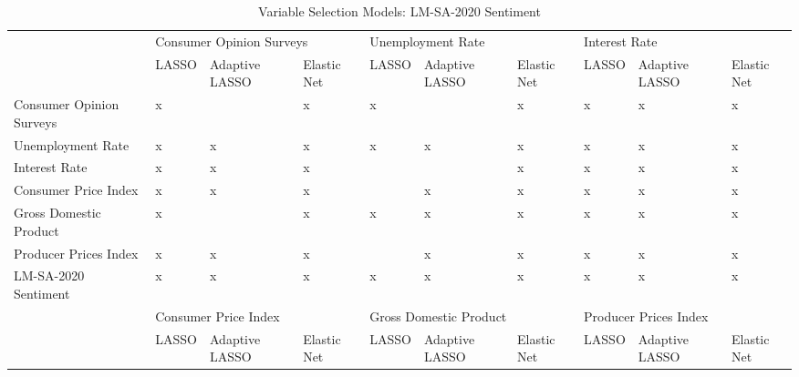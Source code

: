 \begin{landscape}
\begin{table}[]
\caption{Variable Selection Models: LM-SA-2020 Sentiment}
\label{tab:selectionlm}
\begin{adjustbox}{max width=\linewidth}
\begin{tabular}{llllllllll}
\hline
                         & \multicolumn{3}{l}{Consumer Opinion Surveys} & \multicolumn{3}{l}{Unemployment Rate}      & \multicolumn{3}{l}{Interest Rate}         \\
                         & LASSO    & Adaptive LASSO    & Elastic Net   & LASSO    & Adaptive LASSO   & Elastic Net  & LASSO   & Adaptive LASSO   & Elastic Net  \\
Consumer Opinion Surveys & x        &                   & x             & x        &                  & x            & x       & x                & x            \\
Unemployment Rate        & x        & x                 & x             & x        & x                & x            & x       & x                & x            \\
Interest Rate            & x        & x                 & x             &          &                  & x            & x       & x                & x            \\
Consumer Price Index     & x        & x                 & x             &          & x                & x            & x       & x                & x            \\
Gross Domestic Product   & x        &                   & x             & x        & x                & x            & x       & x                & x            \\
Producer Prices Index    & x        & x                 & x             &          & x                & x            & x       & x                & x            \\ \hline
LM-SA-2020 Sentiment          & x        & x                 & x             & x        & x                & x            & x       & x                & x            \\ \hline
                         & \multicolumn{3}{l}{Consumer Price Index}     & \multicolumn{3}{l}{Gross Domestic Product} & \multicolumn{3}{l}{Producer Prices Index} \\
                         & LASSO    & Adaptive LASSO    & Elastic Net   & LASSO    & Adaptive LASSO   & Elastic Net  & LASSO   & Adaptive LASSO   & Elastic Net  \\

\end{tabular}
\end{adjustbox}
\end{table}
\end{landscape}
